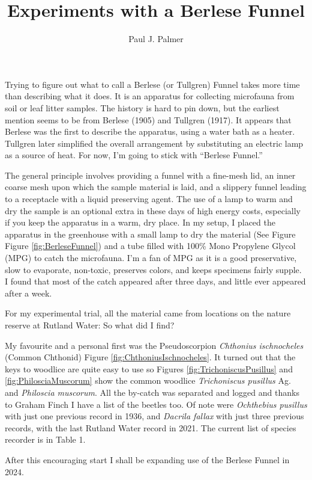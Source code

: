 \documentclass[
]{article}
\title{Experiments with a Berlese Funnel}
\author{Paul J. Palmer}
\date{}
\begin{document}
\maketitle

Trying to figure out what to call a Berlese (or Tullgren) Funnel takes more time than describing what it does. It is an apparatus for collecting microfauna from soil or leaf litter samples. The history is hard to pin down, but the earliest mention seems to be from Berlese (1905) and Tullgren (1917). It appears that Berlese was the first to describe the apparatus, using a water bath as a heater. Tullgren later simplified the overall arrangement by substituting an electric lamp as a source of heat. For now, I'm going to stick with ``Berlese Funnel.''

The general principle involves providing a funnel with a fine-mesh lid, an inner coarse mesh upon which the sample material is laid, and a slippery funnel leading to a receptacle with a liquid preserving agent. The use of a lamp to warm and dry the sample is an optional extra in these days of high energy costs, especially if you keep the apparatus in a warm, dry place. In my setup, I placed the apparatus in the greenhouse with a small lamp to dry the material (See Figure Figure \ref{fig:BerleseFunnel}) and a tube filled with 100\% Mono Propylene Glycol (MPG) to catch the microfauna. I'm a fan of MPG as it is a good preservative, slow to evaporate, non-toxic, preserves colors, and keeps specimens fairly supple. I found that most of the catch appeared after three days, and little ever appeared after a week.

For my experimental trial, all the material came from locations on the nature reserve at Rutland Water: So what did I find?

My favourite and a personal first was the Pseudoscorpion \emph{Chthonius ischnocheles} (Common Chthonid) Figure \ref{fig:ChthoniusIschnocheles}. It turned out that the keys to woodlice are quite easy to use so Figures \ref{fig:TrichoniscusPusillus} and \ref{fig:PhilosciaMuscorum} show the common woodlice \textit{Trichoniscus pusillus} Ag. and \textit{Philoscia muscorum}. All the by-catch was separated and logged and thanks to Graham Finch I have a list of the beetles too. Of note were \emph{Ochthebius pusillus} with just one previous record in 1936, and \emph{Dacrila fallax} with just three previous records, with the last Rutland Water record in 2021. The current list of species recorder is in Table 1.

After this encouraging start I shall be expanding use of the Berlese Funnel in 2024.
\end{document}
